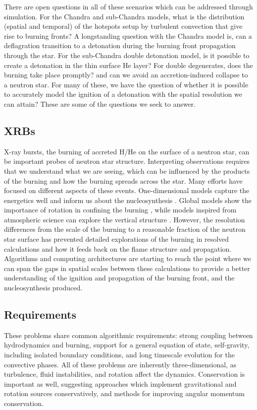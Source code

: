 \documentclass[letterpaper]{jpconf}
\begin{document}
There are open questions in all of these scenarios which can be
addressed through simulation.  For the Chandra and sub-Chandra models,
what is the distribution (spatial and temporal) of the hotspots setup
by turbulent convection that give rise to burning fronts?  A
longstanding question with the Chandra model is, can a deflagration
transition to a detonation during the burning front propagation
through the star.  For the sub-Chandra double detonation model, is it
possible to create a detonation in the thin surface He layer?  For
double degenerates, does the burning take place promptly? and can we
avoid an accretion-induced collapse to a neutron star.  For many of
these, we have the question of whether it is possible to accurately
model the ignition of a detonation with the spatial resolution we can
attain?  These are some of the questions we seek to answer.

\subsection{XRBs}

X-ray bursts, the burning of accreted H/He on the surface of a neutron
star, can be important probes of neutron star structure.  Interpreting
observations requires that we understand what we are seeing, which can
be influenced by the products of the burning and how the burning
spreads across the star.  Many efforts have focused on different
aspects of these events.  One-dimensional models capture the
energetics well and inform us about the nucleosynthesis
\cite{woosley-xrb}.  Global models show the importance of rotation in
confining the burning \cite{SPIT_ETAL02}, while models inspired from
atmospheric science can explore the vertical structure
\cite{cavecchi:2012}.  However, the resolution differences from the
scale of the burning to a reasonable fraction of the neutron star
surface has prevented detailed explorations of the burning in resolved
calculations and how it feeds back on the flame structure and
propagation.  Algorithms and computing architectures are starting to
reach the point where we can span the gaps in spatial scales between
these calculations to provide a better understanding of the ignition
and propagation of the burning front, and the nucleosynthesis produced.


\subsection{Requirements}

These problems share common algorithmic requirements: strong coupling
between hydrodynamics and burning, support for a general equation of state,
self-gravity, including isolated boundary conditions, and long timescale
evolution for the convective phases.  All of these problems are inherently
three-dimensional, as turbulence, fluid instabilities, and rotation affect
the dynamics.  Conservation is important as well, suggesting approaches
which implement gravitational and rotation sources conservatively, and
methods for improving angular momentum conservation.
\end{document}
